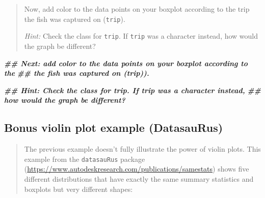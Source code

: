\documentclass[
  10pt,
  letterpaper,
  twoside,
  openright]{book}
\newenvironment{Shaded}{\begin{snugshade}}{\end{snugshade}}
\newcommand{\DocumentationTok}[1]{\textcolor[rgb]{0.56,0.35,0.01}{\textbf{\textit{#1}}}}
\begin{document}
\begin{quote}
Now, add color to the data points on your boxplot according to the trip
the fish was captured on (\texttt{trip}).

\emph{Hint:} Check the class for \texttt{trip}. If \texttt{trip} was a
character instead, how would the graph be different?
\end{quote}

\begin{Shaded}
\begin{Highlighting}[]
\DocumentationTok{\#\# Next: add color to the data points on your boxplot according to the}
\DocumentationTok{\#\# the fish was captured on (\textasciigrave{}trip\textasciigrave{})).}

\DocumentationTok{\#\# Hint: Check the class for \textasciigrave{}trip\textasciigrave{}. If trip was a character instead, }
\DocumentationTok{\#\# how would the graph be different? }
\end{Highlighting}
\end{Shaded}

\hypertarget{bonus-violin-plot-example-datasaurus}{%
\subsection{Bonus violin plot example
(DatasauRus)}\label{bonus-violin-plot-example-datasaurus}}

\begin{quote}
The previous example doesn't fully illustrate the power of violin plots.
This example from the \texttt{datasauRus} package
(\url{https://www.autodeskresearch.com/publications/samestats}) shows
five different distributions that have exactly the same summary
statistics and boxplots but very different shapes:
\end{quote}
\end{document}
